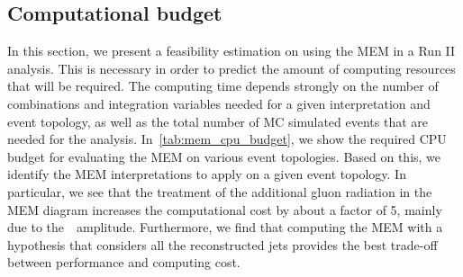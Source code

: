 \subsection{Computational budget}
\label{sec:mem_computational}
In this section, we present a feasibility estimation on using the MEM in a Run II analysis. This is necessary in order to predict the amount of computing resources that will be required. The computing time depends strongly on the number of combinations and integration variables needed for a given interpretation and event topology, as well as the total number of MC simulated events that are needed for the analysis. In~\cref{tab:mem_cpu_budget}, we show the required CPU budget for evaluating the MEM on various event topologies. Based on this, we identify the MEM interpretations to apply on a given event topology. In particular, we see that the treatment of the additional gluon radiation in the MEM diagram increases the computational cost by about a factor of 5, mainly due to the~\ttbb~amplitude. Furthermore, we find that computing the MEM with a hypothesis that considers all the reconstructed jets provides the best trade-off between performance and computing cost.

